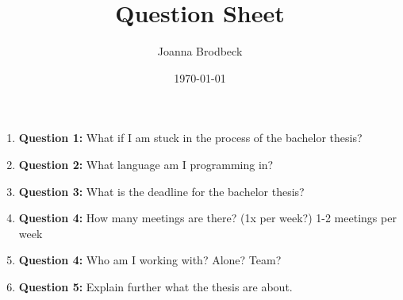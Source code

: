 \documentclass{article}
\title{Question Sheet}
\author{Joanna Brodbeck}
\date{\today}
\begin{document}
\maketitle


\begin{enumerate}[label=\textbf{\arabic*.}]
    \item \textbf{Question 1:} What if I am stuck in the process of the bachelor thesis?
    \vspace{2cm}
    
    \item \textbf{Question 2:} What language am I programming in?
    \vspace{2cm}
    
    \item \textbf{Question 3:} What is the deadline for the bachelor thesis?
    \vspace{2cm}

    \item \textbf{Question 4:} How many meetings are there? (1x per week?) 
    \vspace{2cm}
    1-2 meetings per week

    \item \textbf{Question 4:} Who am I working with? Alone? Team? 
    \vspace{2cm}

    \item \textbf{Question 5:} Explain further what the thesis are about.
    \vspace{2cm}




\end{enumerate}
\end{document}
